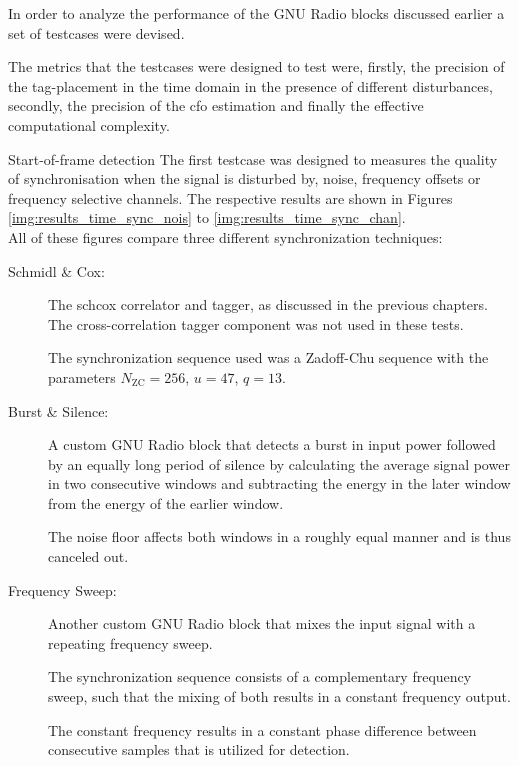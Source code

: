 In order to analyze the performance of the GNU Radio blocks
discussed earlier a set of testcases were devised.

The metrics that the testcases were designed to test
were, firstly, the precision of the tag-placement in
the time domain in the presence of different disturbances,
secondly, the precision of the \gls{cfo} estimation
and finally the effective computational complexity.

\begin{subchapter}{Start-of-frame detection}
  The first testcase was designed to measures the quality
  of synchronisation when the signal is disturbed by,
  noise, frequency offsets or frequency selective channels.
  The respective results are shown in Figures \ref{img:results_time_sync_nois}
  to \ref{img:results_time_sync_chan}. \\

  \noindent All of these figures compare three different synchronization
  techniques:

  \begin{description}
    \item[Schmidl \& Cox:]
      The \acrlong{schcox} correlator and tagger, as discussed in the
      previous chapters.
      The cross-correlation tagger component was not used in these tests.

      The synchronization sequence used was a Zadoff-Chu sequence
      with the parameters $N_\text{ZC}=256$, $u=47$, $q=13$.

    \item[Burst \& Silence:]
      A custom GNU Radio block that detects a burst in input power
      followed by an equally long period of silence by calculating the
      average signal power in two consecutive windows and subtracting the
      energy in the later window from the energy of the earlier window.

      The noise floor affects both windows in a roughly equal manner
      and is thus canceled out.

    \item[Frequency Sweep:]
      Another custom GNU Radio block that mixes the input signal
      with a repeating frequency sweep.

      The synchronization sequence consists of a complementary
      frequency sweep, such that the mixing of both results
      in a constant frequency output.

      The constant frequency results in a constant phase difference
      between consecutive samples that is utilized for detection.
  \end{description}


\end{subchapter}
